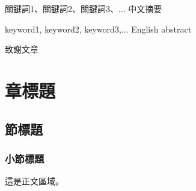 \documentclass[12pt]{report}
\theoremstyle{plain}
\renewcommand{\authorzh}{學生名}
\renewcommand{\depzh}{電子工程系}
\begin{document}
\makecoverpage %

\maketitlepage %

\checkresult{} %

\begin{init} %

\begin{abszh}{關鍵詞1、關鍵詞2、關鍵詞3、...}
中文摘要
\end{abszh}

\begin{absen}{keyword1, keyword2, keyword3,...}
English abstract
\end{absen}

\begin{ack}
致謝文章
\end{ack}

\makecontentlists

\end{init}

\chapter{章標題}

\section{節標題}

\subsection{小節標題}

這是正文區域。

\clearpage
{}


\end{document}
